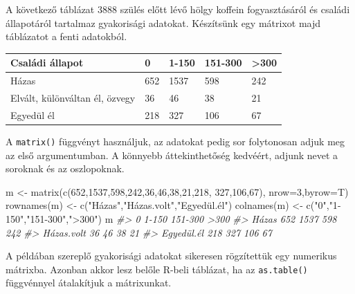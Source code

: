 \documentclass[
]{book}
\newenvironment{Shaded}{\begin{snugshade}}{\end{snugshade}}
\newcommand{\AttributeTok}[1]{\textcolor[rgb]{0.77,0.63,0.00}{#1}}
\newcommand{\CommentTok}[1]{\textcolor[rgb]{0.56,0.35,0.01}{\textit{#1}}}
\newcommand{\DecValTok}[1]{\textcolor[rgb]{0.00,0.00,0.81}{#1}}
\newcommand{\FunctionTok}[1]{\textcolor[rgb]{0.00,0.00,0.00}{#1}}
\newcommand{\NormalTok}[1]{#1}
\newcommand{\OtherTok}[1]{\textcolor[rgb]{0.56,0.35,0.01}{#1}}
\newcommand{\StringTok}[1]{\textcolor[rgb]{0.31,0.60,0.02}{#1}}
\begin{document}
A következő táblázat 3888 szülés előtt lévő hölgy koffein fogyasztásáról és családi állapotáról tartalmaz gyakorisági adatokat. Készítsünk egy mátrixot majd táblázatot a fenti adatokból.

\begin{longtable}[]{@{}lllll@{}}
\toprule
Családi állapot & 0 & 1-150 & 151-300 & \textgreater300 \\
\midrule
\endhead
Házas & 652 & 1537 & 598 & 242 \\
Elvált, különváltan él, özvegy & 36 & 46 & 38 & 21 \\
Egyedül él & 218 & 327 & 106 & 67 \\
\bottomrule
\end{longtable}

A \texttt{matrix()} függvényt használjuk, az adatokat pedig sor folytonosan adjuk meg az első argumentumban. A könnyebb áttekinthetőség kedvéért, adjunk nevet a soroknak és az oszlopoknak.

\begin{Shaded}
\begin{Highlighting}[]
\NormalTok{m }\OtherTok{\textless{}{-}} \FunctionTok{matrix}\NormalTok{(}\FunctionTok{c}\NormalTok{(}\DecValTok{652}\NormalTok{,}\DecValTok{1537}\NormalTok{,}\DecValTok{598}\NormalTok{,}\DecValTok{242}\NormalTok{,}\DecValTok{36}\NormalTok{,}\DecValTok{46}\NormalTok{,}\DecValTok{38}\NormalTok{,}\DecValTok{21}\NormalTok{,}\DecValTok{218}\NormalTok{, }\DecValTok{327}\NormalTok{,}\DecValTok{106}\NormalTok{,}\DecValTok{67}\NormalTok{), }\AttributeTok{nrow=}\DecValTok{3}\NormalTok{,}\AttributeTok{byrow=}\NormalTok{T)}
\FunctionTok{rownames}\NormalTok{(m) }\OtherTok{\textless{}{-}} \FunctionTok{c}\NormalTok{(}\StringTok{"Házas"}\NormalTok{,}\StringTok{"Házas.volt"}\NormalTok{,}\StringTok{"Egyedül.él"}\NormalTok{)}
\FunctionTok{colnames}\NormalTok{(m) }\OtherTok{\textless{}{-}} \FunctionTok{c}\NormalTok{(}\StringTok{"0"}\NormalTok{,}\StringTok{"1{-}150"}\NormalTok{,}\StringTok{"151{-}300"}\NormalTok{,}\StringTok{"\textgreater{}300"}\NormalTok{)}
\NormalTok{m}
\CommentTok{\#\textgreater{}              0 1{-}150 151{-}300 \textgreater{}300}
\CommentTok{\#\textgreater{} Házas      652  1537     598  242}
\CommentTok{\#\textgreater{} Házas.volt  36    46      38   21}
\CommentTok{\#\textgreater{} Egyedül.él 218   327     106   67}
\end{Highlighting}
\end{Shaded}

A példában szereplő gyakorisági adatokat sikeresen rögzítettük egy numerikus mátrixba. Azonban akkor lesz belőle R-beli táblázat, ha az \texttt{as.table()} függvénnyel átalakítjuk a mátrixunkat.
\end{document}
